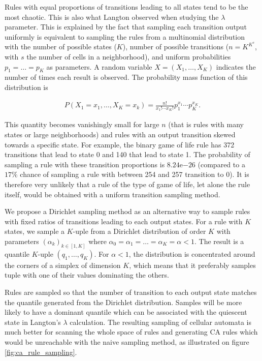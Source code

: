 Rules with equal proportions of transitions leading to all states tend to be the
most chaotic. This is also what Langton observed when studying the $\lambda$
parameter. This is explained by the fact that sampling each transition output
uniformly is equivalent to sampling the rules from a multinomial distribution
with the number of possible states ($K$), number of possible transitions
($n = K^{K^{s}}$, with $s$ the number of cells in a neighborhood), and uniform
probabilities $p_{1}= \ldots= p_{K}$ as parameters. A random variable
$X = (X_{1}, \ldots, X_{K})$ indicates the number of times each result is observed.
The probability mass function of this distribution is

\begin{equation}
  \label{eq:multinomial}
  \begin{aligned}
    P(X_{1}=x_{1}, \ldots , X_{K}=x_{k}) = \frac{n!}{x_{1}!\cdots x_{K}!} p_{1}^{x_{1}}\cdots p_{K}^{x_{K}}.
  \end{aligned}
\end{equation}

This quantity becomes vanishingly small for large $n$ (that is rules with many
states or large neighborhoods) and rules with an output transition skewed
towards a specific state. For example, the binary game of life rule has 372
transitions that lead to state 0 and 140 that lead to state 1. The probability
of sampling a rule with these transition proportions is $8.24\mathrm{e}{-26}$
(compared to a $17\%$ chance of sampling a rule with between 254 and 257
transition to 0). It is therefore very unlikely that a rule of the type of game
of life, let alone the rule itself, would be obtained with a uniform transition
sampling method.

We propose a Dirichlet sampling method as an alternative way to sample rules
with fixed ratios of transitions leading to each output states. For a rule with
$K$ states, we sample a $K$-uple from a Dirichlet distribution of order $K$ with
parameters $(\alpha_{k})_{k\in [1, K]}$ where $\alpha_{0} = \alpha_{1} = \ldots = \alpha_{K} = \alpha < 1$. The
result is a quantile $K$-uple $(q_{1}, \ldots, q_{K})$. For $\alpha < 1$, the distribution
is concentrated around the corners of a simplex of dimension $K$, which means
that it preferably samples tuple with one of their values dominating the others.

Rules are sampled so that the number of transition to each output state matches
the quantile generated from the Dirichlet distribution. Samples will be more
likely to have a dominant quantile which can be associated with the quiescent
state in Langton's $\lambda$ calculation. The resulting sampling of cellular automata
is much better for scanning the whole space of rules and generating \ac{CA}
rules which would be unreachable with the naive sampling method, as illustrated
on figure \ref{fig:ca_rule_sampling}.

